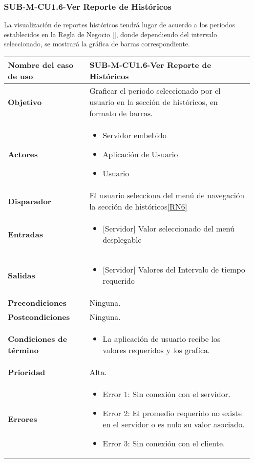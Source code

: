 \subsubsection{SUB-M-CU1.6-Ver Reporte de Históricos}\label{SUB-M-CU1.6}
La visualización de reportes históricos tendrá lugar de acuerdo a los periodos establecidos en la Regla de Negocio \ref{}, donde dependiendo del intervalo seleccionado, se mostrará la gráfica de barras correspondiente. 

\begin{longtable}{|J{5cm}|J{10.3cm}|}
	\hline
	\textbf{Nombre del caso de uso} &
		SUB-M-CU1.6-Ver Reporte de Históricos \\ \hline
	\textbf{Objetivo} &
		Graficar el periodo seleccionado por el usuario en la sección de históricos, en formato de barras. \\ \hline
	\textbf{Actores} &
		\begin{itemize}
			\item Servidor embebido
			\item Aplicación de Usuario
			\item Usuario 
		\end{itemize} \\ \hline
	\textbf{Disparador} & 
		El usuario selecciona del menú de navegación la sección de históricos\ref{RN6}\\ \hline 
	\textbf{Entradas} & 
		\begin{itemize}
			\item{[Servidor]} Valor seleccionado del menú desplegable
		\end{itemize}\\ \hline 
	\textbf{Salidas} & 
		\begin{itemize}
			\item{[Servidor]} Valores del Intervalo de tiempo requerido
		\end{itemize} \\ \hline
	\textbf{Precondiciones} &
		Ninguna.\\ \hline
	\textbf{Postcondiciones} &
		Ninguna.\\ \hline
	\textbf{Condiciones de término} & 
		\begin{itemize}
			\item La aplicación de usuario recibe los valores requeridos y los grafíca.
		\end{itemize} \\ \hline 
	\textbf{Prioridad} & 
		Alta. \\ \hline
	\textbf{Errores} & 
		\begin{itemize}
		    \item \label{CU5:Error1} Error 1: Sin conexión con el servidor.
			\item \label{CU5:Error2} Error 2: El promedio requerido no existe en el servidor o es nulo su valor asociado.
		    \item \label{CU5:Error3} Error 3: Sin conexión con el cliente.
			

\end{itemize}
\end{longtable}
